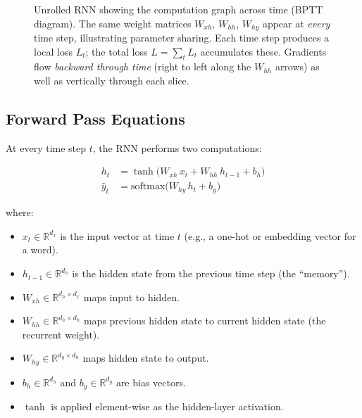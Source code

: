 \documentclass[12pt,a4paper]{article}
\newcommand{\Whh}{W_{hh}}
\newcommand{\Wxh}{W_{xh}}
\newcommand{\Why}{W_{hy}}
\newcommand{\ht}{h_t}
\newcommand{\htmo}{h_{t-1}}
\newcommand{\xt}{x_t}
\newcommand{\yt}{\hat{y}_t}
\begin{document}
\begin{figure}[ht]
\caption{Unrolled RNN showing the computation graph across time (BPTT diagram).
The same weight matrices $\Wxh$, $\Whh$, $\Why$ appear at \emph{every}
time step, illustrating parameter sharing.  Each time step produces a local
loss $L_t$; the total loss $L = \sum_t L_t$ accumulates these.  Gradients flow
\emph{backward through time} (right to left along the $\Whh$ arrows) as well
as vertically through each slice.}
\label{fig:rnn_unfolded}
\end{figure}

\subsection{Forward Pass Equations}
\label{subsec:forward_pass}

At every time step $t$, the RNN performs two computations:

\begin{align}
  \ht &= \tanh\!\bigl(\Wxh\, \xt + \Whh\, \htmo + b_h\bigr)
  \label{eq:hidden_state} \\[4pt]
  \yt &= \mathrm{softmax}\!\bigl(\Why\, \ht + b_y\bigr)
  \label{eq:output}
\end{align}

where:

\begin{itemize}[noitemsep]
  \item $\xt \in \mathbb{R}^{d_x}$ is the input vector at time $t$ (e.g., a
        one-hot or embedding vector for a word).
  \item $\htmo \in \mathbb{R}^{d_h}$ is the hidden state from the previous
        time step (the ``memory'').
  \item $\Wxh \in \mathbb{R}^{d_h \times d_x}$ maps input to hidden.
  \item $\Whh \in \mathbb{R}^{d_h \times d_h}$ maps previous hidden state to
        current hidden state (the recurrent weight).
  \item $\Why \in \mathbb{R}^{d_y \times d_h}$ maps hidden state to output.
  \item $b_h \in \mathbb{R}^{d_h}$ and $b_y \in \mathbb{R}^{d_y}$ are bias
        vectors.
  \item $\tanh$ is applied element-wise as the hidden-layer activation.
\end{itemize}
\end{document}
